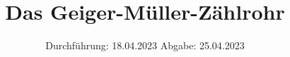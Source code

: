 

%

\subject{V703}
\title{Das Geiger-Müller-Zählrohr}
\date{%
  Durchführung: 18.04.2023
  \hspace{3em}
  Abgabe: 25.04.2023
}


\setlength{\parindent}{0pt} %

\maketitle
\thispagestyle{empty}
\tableofcontents
\newpage



%



\printbibliography{}




